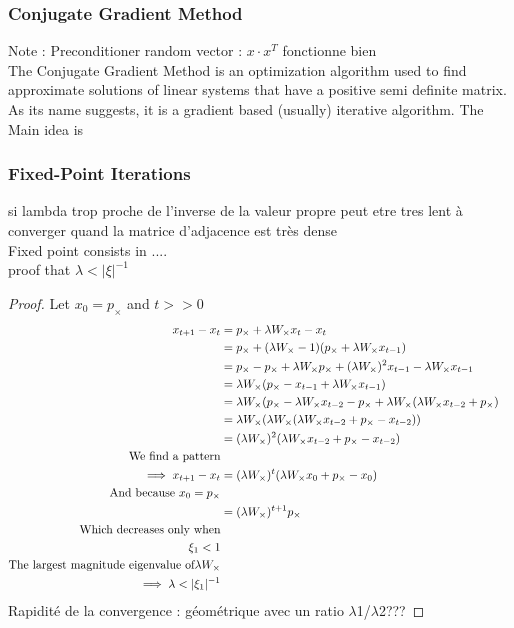 \documentclass{article}
\theoremstyle{definition}
\begin{document}
\subsubsection{Conjugate Gradient Method}
Note : Preconditioner random vector : $x \cdot x^{T}$ fonctionne bien\\
The Conjugate Gradient Method is an optimization algorithm used to find approximate solutions of linear systems that have a positive semi definite matrix. As its name suggests, it is a gradient based (usually) iterative algorithm. The Main idea is 
\subsubsection{Fixed-Point Iterations}
si lambda trop proche de l'inverse de la valeur propre peut etre tres lent à converger quand la matrice d'adjacence est très dense\\
Fixed point consists in ....\\
proof that $\lambda<|\xi|^{-1}$
\begin{proof}
  Let $x_0=p_\times$ and $t>>0$
  \begin{align*}
      x_{t+1}-x_t &= p_\times+\lambda W_{\times} x_t - x_t &\\
      &= p_{\times}+(\lambda W_{\times} - 1)(p_{\times}+\lambda W_{\times} x_{t-1})\\
      &= p_{\times} - p_{\times} + \lambda W_{\times}p_{\times} + (\lambda W_{\times})^2 x_{t-1} - \lambda W_{\times} x_{t-1}\\
      &= \lambda W_{\times}(p_{\times}-x_{t-1}+\lambda W_{\times} x_{t-1}) \\
      &= \lambda W_{\times}(p_{\times}-\lambda W_{\times} x_{t-2} - p_{\times} + \lambda W_{\times}(\lambda W_{\times} x_{t-2} +p_{\times}) \\
      &= \lambda W_{\times} ( \lambda W_{\times} (\lambda W_{\times} x_{t-2}+p_{\times}-x_{t-2})) \\
      &= (\lambda W_{\times})^2(\lambda W_{\times} x_{t-2}+p_{\times} - x_{t-2}) & \\
      \text{We find a pattern}\\
      \implies x_{t+1}-x_t &= (\lambda W_{\times})^t (\lambda W_{\times} x_0 + p_{\times} - x_0) & \\
      \text{And because } x_0 = p_{\times}\\
      &= (\lambda W_{\times})^{t+1} p_{\times}\\
      \text{Which decreases only when}\\
      \xi_1 < 1\\
      \text{The largest magnitude eigenvalue of} \lambda W_{\times}\\
      \implies \lambda < |\xi_1|^{-1}
      && \qedhere
  \end{align*}
  Rapidité de la convergence : géométrique avec un ratio $\lambda$1/$\lambda$2???
\end{proof}
\end{document}
